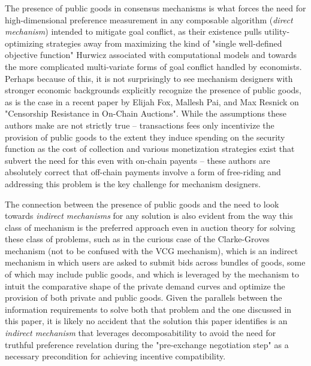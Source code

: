 The presence of public goods in consensus mechanisms is what forces the need for high-dimensional preference measurement in any composable algorithm (\textit{direct mechanism}) intended to mitigate goal conflict, as their existence pulls utility-optimizing strategies away from maximizing the kind of "single well-defined objective function" Hurwicz associated with computational models and towards the more complicated multi-variate forms of goal conflict handled by economists. Perhaps because of this, it is not surprisingly to see mechanism designers with stronger economic backgrounds explicitly recognize the presence of public goods, as is the case in a recent paper by Elijah Fox, Mallesh Pai, and Max Resnick on "Censorship Resistance in On-Chain Auctions". While the assumptions these authors make are not strictly true -- transactions fees only incentivize the provision of public goods to the extent they induce spending on the security function as the cost of collection and various monetization strategies exist that subvert the need for this even with on-chain payents -- these authors are absolutely correct that off-chain payments involve a form of free-riding and addressing this problem is the key challenge for mechanism designers.

The connection between the presence of public goods and the need to look towards \textit{indirect mechanisms} for any solution is also evident from the way this class of mechanism is the preferred approach even in auction theory for solving these class of problems, such as in the curious case of the Clarke-Groves mechanism (not to be confused with the VCG mechanism), which is an indirect mechanism in which users are asked to submit bids across bundles of goods, some of which may include public goods, and which is leveraged by the mechanism to intuit the comparative shape of the private demand curves and optimize the provision of both private and public goods. Given the parallels between the information requirements to solve both that problem and the one discussed in this paper, it is likely no accident that the solution this paper identifies is an \textit{indirect mechanism} that leverages decomposabitility to avoid the need for truthful preference revelation during the "pre-exchange negotiation step" as a necessary precondition for achieving incentive compatibility.


